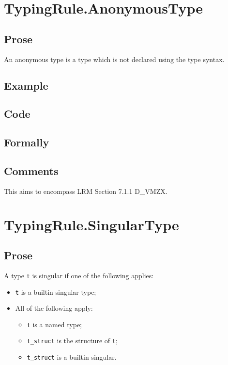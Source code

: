 \documentclass{book}
\begin{document}
\section{TypingRule.AnonymousType \label{sec:TypingRule.AnonymousType}}

    \subsection{Prose} 
    An anonymous type is a type which is not declared using the type syntax. 

    \subsection{Example}

    \subsection{Code}

    \subsection{Formally}

    \subsection{Comments}
    This aims to encompass LRM Section 7.1.1 D\_VMZX.

\section{TypingRule.SingularType}

    \subsection{Prose}
    A type \texttt{t} is singular if one of the following applies:
    \begin{itemize}
    \item \texttt{t} is a builtin singular type;
    \item All of the following apply:
      \begin{itemize}
      \item \texttt{t} is a named type;
      \item \texttt{t\_struct} is the structure of \texttt{t};
      \item \texttt{t\_struct} is a builtin singular.
      \end{itemize} 
    \end{itemize}
\end{document}
